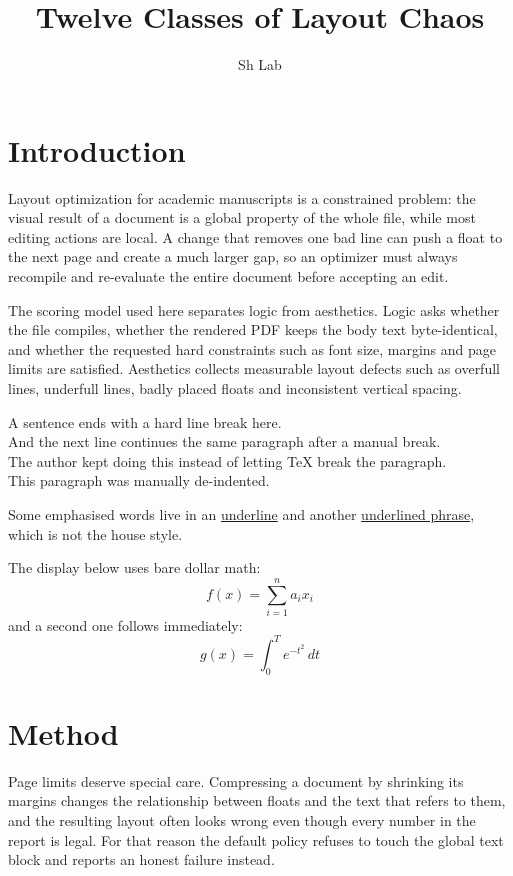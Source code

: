 \documentclass[10pt,a4paper]{article}
\title{Twelve Classes of Layout Chaos}
\author{Sh Lab}
\date{}
\begin{document}
\maketitle
\section{Introduction}
Layout optimization for academic manuscripts is a constrained problem: the visual result of a document is a global property of the whole file, while most editing actions are local. A change that removes one bad line can push a float to the next page and create a much larger gap, so an optimizer must always recompile and re-evaluate the entire document before accepting an edit.

The scoring model used here separates logic from aesthetics. Logic asks whether the file compiles, whether the rendered PDF keeps the body text byte-identical, and whether the requested hard constraints such as font size, margins and page limits are satisfied. Aesthetics collects measurable layout defects such as overfull lines, underfull lines, badly placed floats and inconsistent vertical spacing.

A sentence ends with a hard line break here.\\
And the next line continues the same paragraph after a manual break.\\
The author kept doing this instead of letting TeX break the paragraph.\\

\noindent This paragraph was manually de-indented.

\vspace{4cm}

Some emphasised words live in an \underline{underline} and another
\underline{underlined phrase}, which is not the house style.

The display below uses bare dollar math:
$$f(x) = \sum_{i=1}^{n} a_i x_i$$
and a second one follows immediately:
$$g(x) = \int_0^T e^{-t^2}\,dt$$

\newpage

\section{Method}
Page limits deserve special care. Compressing a document by shrinking its margins changes the relationship between floats and the text that refers to them, and the resulting layout often looks wrong even though every number in the report is legal. For that reason the default policy refuses to touch the global text block and reports an honest failure instead.
\end{document}

